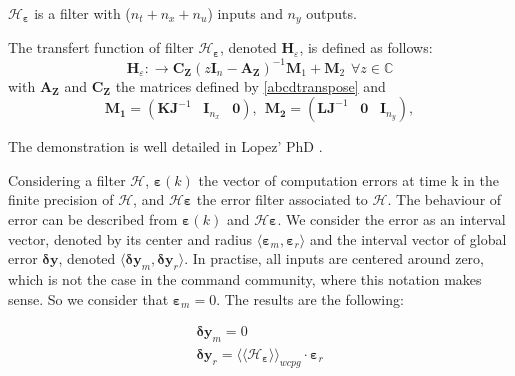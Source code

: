 		$\mathcal{H}_{\boldsymbol{\varepsilon}}$ is a filter with ($n_t+n_x+n_u$) inputs and $n_y$ outputs.
		\begin{proposition}
			The transfert function of filter $\mathcal{H_{\boldsymbol{\varepsilon}}}$, denoted $\boldsymbol{H}_\varepsilon$, is defined as follows:
			\begin{equation}
				\boldsymbol{H}_{\varepsilon}: \rightarrow \boldsymbol{C_Z}(z\boldsymbol{I}_n-\boldsymbol{A_Z})^{-1}\boldsymbol{M}_1 +\boldsymbol{M}_2 \hspace{5pt} \forall z \in \mathbb{C}
			\end{equation}
			with $\boldsymbol{A_Z}$ and $\boldsymbol{C_Z}$ the matrices defined by \ref{abcdtranspose} and
			\begin{equation}
				\boldsymbol{M_1}=(\boldsymbol{KJ}^{-1}   \hspace{10pt}\boldsymbol{I}_{n_x} \hspace{10pt} \boldsymbol{0}), \hspace{5pt}
				\boldsymbol{M_2}=(\boldsymbol{LJ}^{-1}  \hspace{10pt}\boldsymbol{0} \hspace{10pt}\boldsymbol{I}_{n_y}), 
			\end{equation}
		\end{proposition}
		The demonstration is well detailed in Lopez' PhD \cite{lopez}.

		\begin{corollary} \label{corimp}
			Considering a filter $\mathcal{H}$, $\boldsymbol{\varepsilon}(k)$ the vector of computation errors at time k in the finite precision of $\mathcal{H}$,
			and $\mathcal{H}\boldsymbol{\varepsilon}$ the error filter associated to $\mathcal{H}$.
			The behaviour of error can be described from $\boldsymbol{\varepsilon}(k)$ and $\mathcal{H}\boldsymbol{\varepsilon}$.
			We consider the error as an interval vector, denoted by its center and radius $\langle \boldsymbol{\varepsilon}_m, \boldsymbol{\varepsilon}_r \rangle$ and 
			the interval vector of global error $\boldsymbol{\delta y}$, denoted $\langle \boldsymbol{\delta y}_m, \boldsymbol{\delta y}_r \rangle$.
			In practise, all inputs are centered around zero, which is not the case in the command community, where this notation makes sense.
			So we consider that $\boldsymbol{\varepsilon}_m=0$.
			The results are the following:

			\begin{eqnarray} \label{eqprec}
				\boldsymbol{\delta y}_m = 0 \\
				\boldsymbol{\delta y}_r = \langle\langle \mathcal{H}_{\boldsymbol{\varepsilon}} \rangle\rangle_{wcpg} \cdot \boldsymbol{\varepsilon}_r
			\end{eqnarray}
		\end{corollary}

